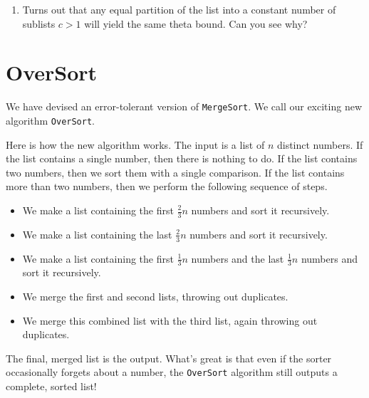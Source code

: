 \documentclass[12pt]{article}
\begin{document}
\begin{enumerate}
\item Turns out that any equal partition of the list into a constant number of sublists $c>1$ will yield the same theta bound. Can you see why?

\end{enumerate}



\newpage
\section{OverSort}

We have devised an error-tolerant version of {\tt MergeSort}.  We call
our exciting new algorithm {\tt OverSort}.

Here is how the new algorithm works.  The input is a list of $n$
distinct numbers.  If the list contains a single number, then there is
nothing to do.  If the list contains two numbers, then we sort them
with a single comparison.  If the list contains more than two numbers,
then we perform the following sequence of steps.

\begin{itemize}
\item We make a list containing the first $\frac{2}{3}n$
numbers and sort it recursively.

\item We make a list containing the last $\frac{2}{3}n$ numbers
and sort it recursively.

\item We make a list containing the first $\frac{1}{3}n$ numbers and
the last $\frac{1}{3}n$ numbers and sort it recursively.

\item We merge the first and second lists, throwing out duplicates.

\item We merge this combined list with the third list, again throwing out
duplicates.
\end{itemize}

The final, merged list is the output.  What's great is that even if
the sorter occasionally forgets about a number, the {\tt OverSort}
algorithm still outputs a complete, sorted list!
\end{document}
